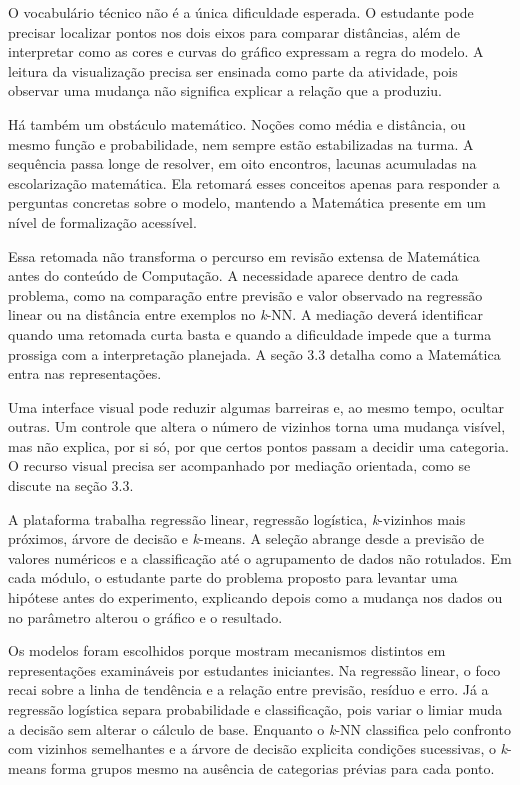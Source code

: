O vocabulário técnico não é a única dificuldade esperada. O estudante pode precisar localizar pontos nos dois eixos para comparar distâncias, além de interpretar como as cores e curvas do gráfico expressam a regra do modelo. A leitura da visualização precisa ser ensinada como parte da atividade, pois observar uma mudança não significa explicar a relação que a produziu.

Há também um obstáculo matemático. Noções como média e distância, ou mesmo função e probabilidade, nem sempre estão estabilizadas na turma. A sequência passa longe de resolver, em oito encontros, lacunas acumuladas na escolarização matemática. Ela retomará esses conceitos apenas para responder a perguntas concretas sobre o modelo, mantendo a Matemática presente em um nível de formalização acessível.

Essa retomada não transforma o percurso em revisão extensa de Matemática antes do conteúdo de Computação. A necessidade aparece dentro de cada problema, como na comparação entre previsão e valor observado na regressão linear ou na distância entre exemplos no \textit{k}-NN. A mediação deverá identificar quando uma retomada curta basta e quando a dificuldade impede que a turma prossiga com a interpretação planejada. A seção 3.3 detalha como a Matemática entra nas representações.

Uma interface visual pode reduzir algumas barreiras e, ao mesmo tempo, ocultar outras. Um controle que altera o número de vizinhos torna uma mudança visível, mas não explica, por si só, por que certos pontos passam a decidir uma categoria. O recurso visual precisa ser acompanhado por mediação orientada, como se discute na seção 3.3.

A plataforma trabalha regressão linear, regressão logística, \textit{k}-vizinhos mais próximos, árvore de decisão e \textit{k}-means. A seleção abrange desde a previsão de valores numéricos e a classificação até o agrupamento de dados não rotulados. Em cada módulo, o estudante parte do problema proposto para levantar uma hipótese antes do experimento, explicando depois como a mudança nos dados ou no parâmetro alterou o gráfico e o resultado.

Os modelos foram escolhidos porque mostram mecanismos distintos em representações examináveis por estudantes iniciantes. Na regressão linear, o foco recai sobre a linha de tendência e a relação entre previsão, resíduo e erro. Já a regressão logística separa probabilidade e classificação, pois variar o limiar muda a decisão sem alterar o cálculo de base. Enquanto o \textit{k}-NN classifica pelo confronto com vizinhos semelhantes e a árvore de decisão explicita condições sucessivas, o \textit{k}-means forma grupos mesmo na ausência de categorias prévias para cada ponto.

